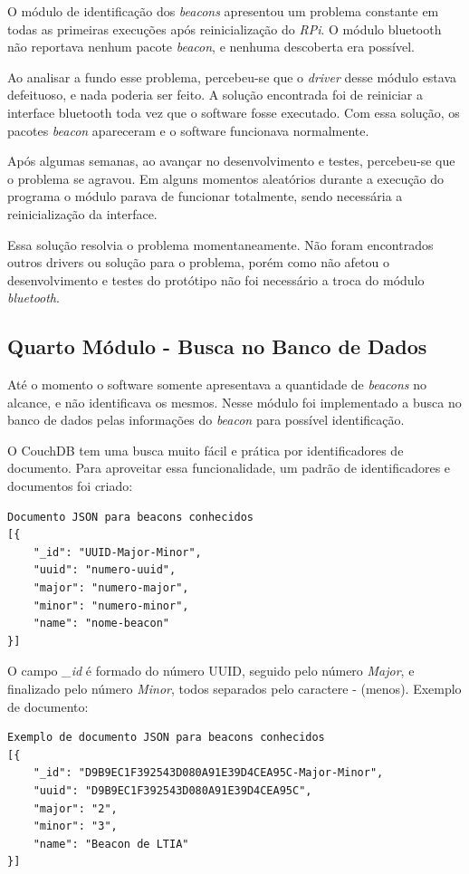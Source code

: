 O módulo de identificação dos \textit{beacons} apresentou um problema constante em todas as primeiras execuções após reinicialização do \textit{RPi}. O módulo bluetooth não reportava nenhum pacote \textit{beacon}, e nenhuma descoberta era possível. 

Ao analisar a fundo esse problema, percebeu-se que o \textit{driver} desse módulo estava defeituoso, e nada poderia ser feito. A solução encontrada foi de reiniciar a interface bluetooth toda vez que o software fosse executado. Com essa solução, os pacotes \textit{beacon} apareceram e o software funcionava normalmente.

Após algumas semanas, ao avançar no desenvolvimento e testes, percebeu-se que o problema se agravou. Em alguns momentos aleatórios durante a execução do programa o módulo parava de funcionar totalmente, sendo necessária a reinicialização da interface.

Essa solução resolvia o problema momentaneamente. Não foram encontrados outros drivers ou solução para o problema, porém como não afetou o desenvolvimento e testes do protótipo não foi necessário a troca do módulo \textit{bluetooth}.

\subsection{Quarto Módulo - Busca no Banco de Dados}\label{sec:quarto-modulo}

Até o momento o software somente apresentava a quantidade de \textit{beacons} no alcance, e não identificava os mesmos. Nesse módulo foi implementado a busca no banco de dados pelas informações do \textit{beacon} para possível identificação.

O CouchDB tem uma busca muito fácil e prática por identificadores de documento. Para aproveitar essa funcionalidade, um padrão de identificadores e documentos foi criado:

\begin{verbatim}
Documento JSON para beacons conhecidos
[{
    "_id": "UUID-Major-Minor",
    "uuid": "numero-uuid",
    "major": "numero-major",
    "minor": "numero-minor",
    "name": "nome-beacon"
}]
\end{verbatim}

O campo \textit{\_id} é formado do número UUID, seguido pelo número \textit{Major}, e finalizado pelo número \textit{Minor}, todos separados pelo caractere - (menos). Exemplo de documento:

\begin{verbatim}
Exemplo de documento JSON para beacons conhecidos
[{
    "_id": "D9B9EC1F392543D080A91E39D4CEA95C-Major-Minor",
    "uuid": "D9B9EC1F392543D080A91E39D4CEA95C",
    "major": "2",
    "minor": "3",
    "name": "Beacon de LTIA"
}]
\end{verbatim}

